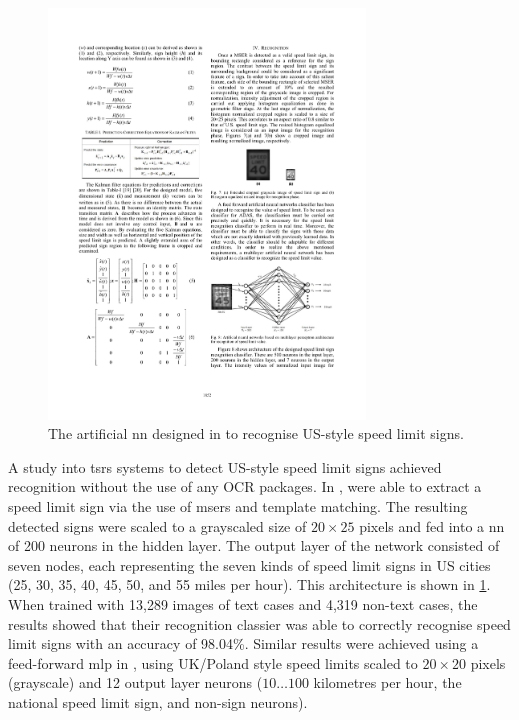 \begin{figure}[h]
  \centering
  \includegraphics[width=0.75\textwidth]{images/background/kundu2015_nn}
  \caption[A NN designed to recognised speed limit signs]{The artificial  \gls{nn} designed in \citet{Kundu:2015vq} to recognise US-style speed limit signs.}
  \label{fig:background:recognition:kundu2015_nn}
\end{figure}

A \citeyear{Kundu:2015vq} study into \glspl{tsr} systems to detect US-style speed limit signs achieved recognition without the use of any OCR packages. In \citep{Kundu:2015vq}, \citeauthor{Kundu:2015vq} were able to extract a speed limit sign via the use of \glspl{mser} and template matching. The resulting detected signs were scaled to a grayscaled size of $20 \times 25$ pixels and fed into a  \gls{nn} of 200 neurons in the hidden layer. The output layer of the network consisted of seven nodes, each representing the seven kinds of speed limit signs in US cities (25, 30, 35, 40, 45, 50, and 55 miles per hour). This architecture is shown in \cref{fig:background:recognition:kundu2015_nn}. When trained with 13,289 images of text cases and 4,319 non-text cases, the results showed that their recognition classier was able to correctly recognise speed limit signs with an accuracy of 98.04\%. Similar results were achieved using a feed-forward \gls{mlp} in \cite{Eichner:2008dw}, using UK/Poland style speed limits scaled to $20 \times 20$ pixels (grayscale) and 12 output layer neurons ($10 \dots 100$ kilometres per hour, the national speed limit sign, and non-sign neurons).

